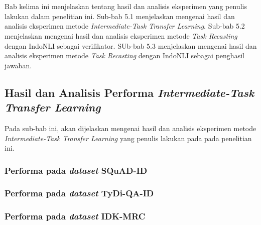 \chapter{\babLima}
\label{bab:5}
Bab kelima ini menjelaskan tentang hasil dan analisis eksperimen yang penulis lakukan dalam penelitian ini. Sub-bab 5.1 menjelaskan mengenai hasil dan analisis eksperimen metode \emph{Intermediate-Task Transfer Learning}. Sub-bab 5.2 menjelaskan mengenai hasil dan analisis eksperimen metode \emph{Task Recasting} dengan IndoNLI sebagai verifikator. SUb-bab 5.3 menjelaskan mengenai hasil dan analisis eksperimen metode \emph{Task Recasting} dengan IndoNLI sebagai penghasil jawaban.

\section{Hasil dan Analisis Performa \emph{Intermediate-Task Transfer Learning}}
Pada sub-bab ini, akan dijelaskan mengenai hasil dan analisis eksperimen metode \emph{Intermediate-Task Transfer Learning} yang penulis lakukan pada pada penelitian ini. 

\subsection{Performa pada  \emph{dataset} SQuAD-ID}

\subsection{Performa pada  \emph{dataset} TyDi-QA-ID}

\subsection{Performa pada  \emph{dataset} IDK-MRC}


